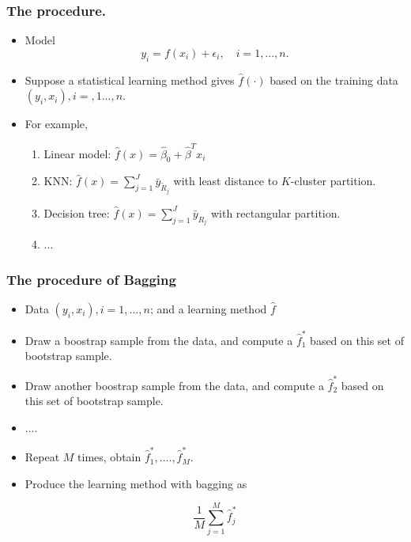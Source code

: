 \documentclass{beamer}
\begin{document}
                   \begin{frame}
                   \frametitle{The procedure.  }
                   \begin{itemize}
                   \item  Model
                   $$ y_i = f(x_i) +\epsilon_i, \quad i=1,..., n.$$
                   \item Suppose a statistical learning method gives $\hat f(\cdot)$ based on the training data
                   $ (y_i, x_i), i=,1..., n$.
                   \item  For example, 
                   \begin{enumerate} 
                   	\item Linear model: $\hat f(x) = \hat \beta_0  + \hat \beta^Tx_i$
                 
                   \item  KNN: $\hat f(x) = \sum_{j=1}^J \bar y_{\tilde R_j}$ with least distance to $K$-cluster partition. 
                   \item  Decision tree: $\hat f(x) = \sum_{j=1}^J \bar y_{R_j}$ with rectangular partition.
                   \item ...
               \end{enumerate}
              	\end{itemize}
              \end{frame}   
                     
                     \begin{frame}
                     	\frametitle{The procedure of Bagging  }
                     	\begin{itemize}
                     		\item Data $(y_i, x_i), i=1,..., n$; and a learning method 
                     		$\hat f$  
                     		\item Draw a boostrap sample from the data, and compute a $\hat f^*_1$ based on 
                     		this set of bootstrap sample. 
                     		\item    Draw another boostrap sample from the data, and 
                     		compute a $\hat f^*_2$ based on 
                     		this set of bootstrap sample. 
                     		\item .... 
                     		\item Repeat $M$ times, obtain $\hat f^*_1, ...., \hat f^*_M$.
                     		\item Produce the  learning method with bagging as
                     		
                     		$$ \frac{1}{M} \sum_{j=1}^M \hat f^*_j $$
                     		
                     		
                     		
                   \end{itemize}
                   \end{frame} 
                   
\end{document}
